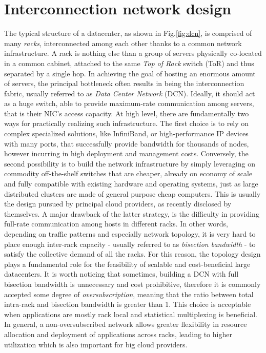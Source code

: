

\section{Interconnection network design}
\label{sec:topology}
The typical structure of a datacenter, as shown in Fig.\ref{fig:dcn},  
is comprised of many \textit{racks}, interconnected among each other thanks to a common network infrastructure. A rack is nothing else than a group of servers physically co-located in a common cabinet, attached to the same \textit{Top of Rack} switch (ToR) and thus  separated by a single hop. In achieving the goal of hosting an enormous amount of servers, the principal bottleneck often results in being the interconnection fabric, usually referred to as \textit{Data Center Network} (DCN). Ideally, it should act as a huge switch, able to provide maximum-rate communication among servers, that is their NIC's access capacity.  At high level, there are fundamentally two ways for practically realizing such infrastructure. The first choice is to rely on complex specialized solutions, like InfiniBand, or high-performance IP devices with many ports, that successfully provide bandwidth for thousands of nodes, however incurring in high deployment and management costs. Conversely, the second possibility is to build the network infrastructure by simply leveraging on commodity off-the-shelf switches that are cheaper, already on economy of scale and fully compatible with existing hardware and operating systems, just as large distributed clusters are made of general purpose cheap computers. This is usually the design pursued by principal cloud providers, as recently disclosed by themselves. A major drawback of the latter strategy, is the difficulty in providing full-rate communication among hosts in different racks. In other words, depending on traffic patterns and especially network topology, it is very hard to place enough inter-rack capacity - usually referred to as \textit{bisection bandwidth} - to satisfy the collective demand of all the racks. 
For this reason, the topology design plays a fundamental role for the feasibility of scalable and cost-beneficial large datacenters. It is worth noticing that sometimes, building a DCN with full bisection bandwidth is unnecessary and cost prohibitive, therefore it is commonly accepted some degree of \textit{oversubscription}, meaning that the ratio between total intra-rack and bisection bandwidth is greater than 1. This choice is acceptable when applications are mostly rack local and statistical multiplexing is beneficial. In general, a non-oversubscribed network allows greater flexibility in resource allocation and deployment of applications across racks, leading to higher utilization which is also important for big cloud providers.
